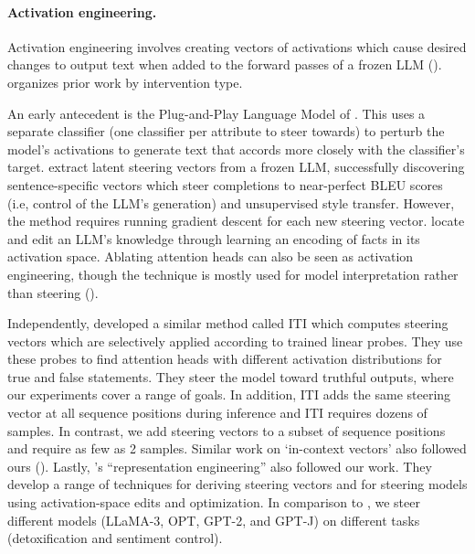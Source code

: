 \documentclass{article}
\newcommand{\shortmethod}{\text{ActAdd}}
\theoremstyle{plain}
\theoremstyle{definition}
\theoremstyle{remark}
\begin{document}





\paragraph{Activation engineering.}
Activation engineering involves creating vectors of activations which cause desired changes to output text when added to the forward passes of a frozen LLM (\cite{dathathri2020plug}).  organizes prior work by intervention type. %

An early antecedent is the Plug-and-Play Language Model of \citealt{dathathri2020plug}. This uses a separate classifier (one classifier per attribute to steer towards) to perturb the
model's activations to generate text that accords more closely with the classifier's target.
%
\citealt{subramani-2022-extracting} extract latent steering vectors from a frozen LLM, successfully discovering sentence-specific vectors which steer completions to near-perfect BLEU scores (i.e, control of the LLM's generation) and unsupervised style transfer. However, the method requires running gradient descent for each new steering vector.
% 
\citealt{hernandez2023inspecting} locate and edit an LLM's knowledge through learning an encoding of facts in its activation space. Ablating attention heads can also be seen as activation engineering, though the technique is mostly used for model interpretation rather than steering (\cite{NEURIPS2019_2c601ad9,olsson2022context}).


Independently, \citealt{li2023inferencetime} developed a similar method called ITI which computes steering vectors which are selectively applied according to trained linear probes. They use these probes to find attention heads with different activation distributions for true and false statements. They steer the model toward truthful outputs, where our experiments cover a range of goals. In addition, ITI adds the same steering vector at all sequence positions during inference and ITI requires dozens of samples. In contrast, {\shortmethod} we add steering vectors to a subset of sequence positions and require as few as 2 samples. Similar work on `in-context vectors' also followed ours (\cite{liu2023incontext}). Lastly, \citet{zou2023representation}'s ``representation engineering'' also followed our work. They develop a range of techniques for deriving steering vectors and for steering models using activation-space edits and optimization. In comparison to \citet{zou2023representation}, we steer different models (LLaMA-3, OPT, GPT-2, and GPT-J) on different tasks (detoxification and sentiment control).
\end{document}
